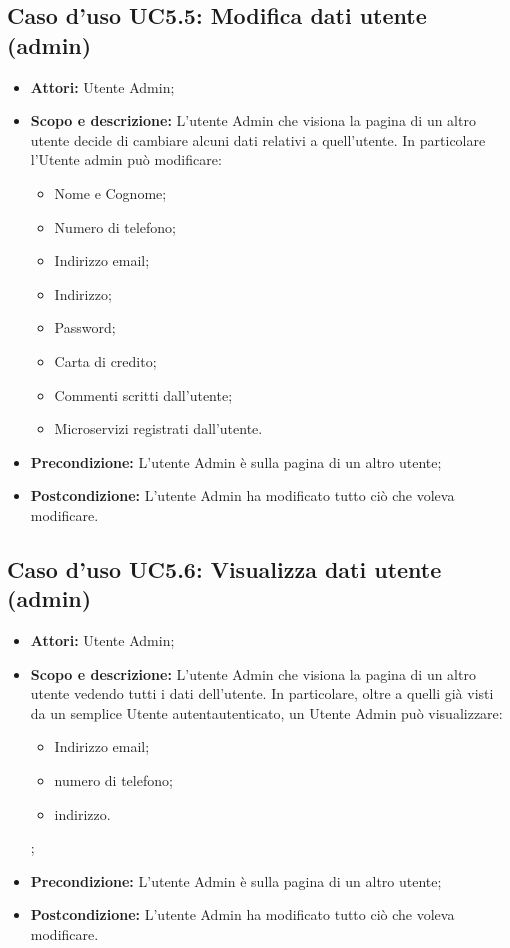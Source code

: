 \documentclass[12pt,a4paper,titlepage]{article}
\begin{document}
	\subsection{Caso d'uso UC5.5: Modifica dati utente (admin)}
	\label{UC5.5}
	\begin{itemize}
		\item \textbf{Attori: }Utente Admin;
		\item \textbf{Scopo e descrizione: }L'utente Admin che visiona la pagina di un altro utente decide di cambiare alcuni dati relativi a quell'utente. In particolare l'Utente admin può modificare:
		\begin{itemize}
			\item Nome e Cognome;
			\item Numero di telefono;
			\item Indirizzo email;
			\item Indirizzo;
			\item Password;
			\item Carta di credito;
			\item Commenti scritti dall'utente;
			\item Microservizi registrati dall'utente.
		\end{itemize}
		\item \textbf{Precondizione: }L'utente Admin è sulla pagina di un altro utente;
		\item \textbf{Postcondizione: }L'utente Admin ha modificato tutto ciò che voleva modificare.
	\end{itemize}
	\subsection{Caso d'uso UC5.6: Visualizza dati utente (admin)}
	\label{UC5.6}
	\begin{itemize}
		\item \textbf{Attori: }Utente Admin;
		\item \textbf{Scopo e descrizione: }L'utente Admin che visiona la pagina di un altro utente vedendo tutti i dati dell'utente. In particolare, oltre a quelli già visti da un semplice Utente autentautenticato, un Utente Admin può visualizzare:
		\begin{itemize}
			\item Indirizzo email;
			\item numero di telefono;
			\item indirizzo.
		\end{itemize};
		\item \textbf{Precondizione: }L'utente Admin è sulla pagina di un altro utente;
		\item \textbf{Postcondizione: }L'utente Admin ha modificato tutto ciò che voleva modificare.
	\end{itemize}
\end{document}

